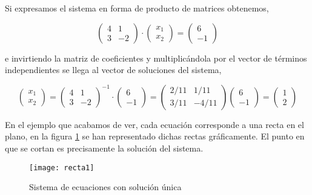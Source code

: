 Si expresamos el sistema en forma de producto de matrices obtenemos,

\begin{equation*}
\begin{pmatrix}
4& 1\\
3& -2
\end{pmatrix} \cdot \begin{pmatrix}
x_1\\
x_2
\end{pmatrix}=\begin{pmatrix}
6\\
-1
\end{pmatrix}
\end{equation*}

e invirtiendo la matriz de coeficientes y multiplicándola por el vector de términos independientes se llega al vector de soluciones del sistema,

\begin{equation*}
\begin{pmatrix}
x_1\\
x_2
\end{pmatrix}= \begin{pmatrix}
4& 1\\
3& -2
\end{pmatrix}^{-1} \cdot \begin{pmatrix}
6\\
-1
\end{pmatrix}=\begin{pmatrix}
2/11& 1/11\\
3/11& -4/11
\end{pmatrix}\begin{pmatrix}
6\\
-1
\end{pmatrix}=\begin{pmatrix}
1\\
2
\end{pmatrix}
\end{equation*}

En el ejemplo que acabamos de ver, cada ecuación corresponde a una recta en el plano, en la figura \ref{fig:recta1} se han representado dichas rectas gráficamente. El punto en que se cortan es precisamente la solución del sistema.

\begin{figure}[h]
\centering
\texttt{[image: recta1]}
\caption{Sistema de ecuaciones con solución única}
\label{fig:recta1}
\end{figure}


